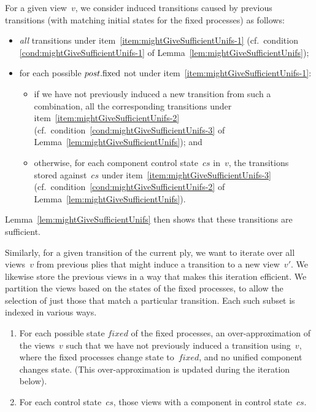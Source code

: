 For a given view~$v$, we consider induced transitions caused by previous
transitions (with matching initial states for the fixed processes) as follows:
%
\begin{itemize}
\item \emph{all} transitions under item~\ref{item:mightGiveSufficientUnifs-1}
  (cf.~condition \ref{cond:mightGiveSufficientUnifs-1} of
  Lemma~\ref{lem:mightGiveSufficientUnifs}); 

\item for each possible $post.\mathrm{fixed}$ not under
  item~\ref{item:mightGiveSufficientUnifs-1}: 
  \begin{itemize}
  \item if we have not previously induced a new transition from such a
    combination, all the corresponding transitions under
    item~\ref{item:mightGiveSufficientUnifs-2}
    (cf.~condition~\ref{cond:mightGiveSufficientUnifs-3} of
    Lemma~\ref{lem:mightGiveSufficientUnifs}); and

  \item otherwise, for each component control state~$cs$ in~$v$, the
    transitions stored against~$cs$ under
    item~\ref{item:mightGiveSufficientUnifs-3}
    (cf.~condition~\ref{cond:mightGiveSufficientUnifs-2} of
    Lemma~\ref{lem:mightGiveSufficientUnifs}).
  \end{itemize}
\end{itemize}
%
Lemma~\ref{lem:mightGiveSufficientUnifs} then shows that these transitions are
sufficient. 

Similarly, for a given transition of the current ply, we want to iterate over
all views~$v$ from previous plies that might induce a transition to a new
view~$v'$.  We likewise store the previous views in a way that makes this
iteration efficient.  We partition the views based on the states of the fixed
processes, to allow the selection of just those that match a particular
transition.
Each such subset is indexed in various ways.
%
\begin{enumerate}
\item\label{item:mightGiveSufficientUnifs-views1} For each possible state
  $fixed$ of the fixed processes, an over-approximation of the views~$v$ such
  that we have not previously induced a transition using~$v$, where the fixed
  processes change state to~$fixed$, and no unified component changes state.
  (This over-approximation is updated during the iteration below).

\item\label{item:mightGiveSufficientUnifs-views2} For each control state~$cs$,
  those views with a component in control state~$cs$.
\end{enumerate}

